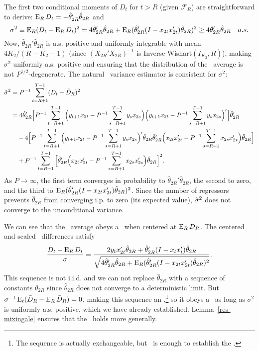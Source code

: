 \documentclass[11pt]{article}
\begin{document}
The first two conditional moments of $D_t$ for $t > R$ (given
$\mathcal{F}_R$) are straightforward to derive: $\operatorname{E}_R D_t = -
\hat{\theta}_{2R}' \hat{\theta}_{2R}$ and
\begin{equation*}
  \sigma^2 \equiv \operatorname{E}_R(D_t - \operatorname{E}_R D_t)^2 = 4
  \hat{\theta}_{2R}' \hat{\theta}_{2R} +
  \operatorname{E}_R(\hat{\theta}_{2R}' (I - x_{2t} x_{2t}')
  \hat{\theta}_{2R})^2   \geq 4 \hat{\theta}_{2R}'
  \hat{\theta}_{2R} \quad a.s.
\end{equation*}
Now, $\hat{\theta}_{2R}' \hat{\theta}_{2R}$ is
a.s. positive and uniformly integrable with mean $4 K_2 / (R - K_2 -
1)$ (since $(X_{2R}'X_{2R})^{-1}$ is Inverse-Wishart$(I_{K_2}, R)$),
making $\sigma^2$ uniformly a.s. positive and ensuring that the
distribution of the \oos\ average is not $P^{1/2}$-degenerate.  The
natural \oos\ variance estimator is consistent for $\sigma^2$:
\begin{align*}
  \hat{\sigma}^2 &= P^{-1} \sum_{t=R+1}^{T-1} (D_t - \bar{D}_{R})^2 \\
  &= 4 \hat{\theta}_{2R}' \Big[P^{-1} \sum_{t=R+1}^{T-1}
  \Big(y_{t+1} x_{2t} - P^{-1} \sum_{s=R+1}^{T-1} y_s x_{2s}\Big)
  \Big(y_{t+1} x_{2t} - P^{-1} \sum_{s=R+1}^{T-1} y_s
  x_{2s}\Big)'\Big] \hat{\theta}_{2R}' \\ & \quad - 4
  \Big[P^{-1} \sum_{t=R+1}^{T-1} \Big(y_{t+1} x_{2t} - P^{-1}
  \sum_{s=R+1}^{T-1} y_s x_{2s}\Big)' \hat{\theta}_{2R}
  \hat{\theta}_{2R}' \Big(x_{2t} x_{2t}' - P^{-1}
  \sum_{s=R+1}^{T-1} x_{2s} x_{2s}' \Big) \hat{\theta}_{2R} \Big]
  \\ &\quad + P^{-1} \sum_{t=R+1}^{T-1}
  \Big[\hat{\theta}_{2R}' \Big(x_{2t} x_{2t}' - P^{-1}
  \sum_{s=R+1}^{T-1} x_{2s} x_{2s}' \Big) \hat{\theta}_{2R}  \Big]^{2}.
\end{align*}
As $P \to \infty$, the first term converges in probability to
$\hat{\theta}_{2R}' \hat{\theta}_{2R}$, the second to zero,
and the third to $\operatorname{E}_R(\hat{\theta}_{2R}'(I - x_{2t}x_{2t}')
\hat{\theta}_{2R})^2$.  Since the number of regressors prevents
$\hat{\theta}_{2R}$ from converging i.p. to zero (its expected
value), $\hat{\sigma}^2$ does not converge to the unconditional
variance.

We can see that the \oos\ average obeys a \clt\ when centered at $\operatorname{E}_R
\bar{D}_R$.  The centered and scaled \oos\ differences satisfy
\begin{equation*}
  \frac{D_t - \operatorname{E}_R D_t}{\sigma} =
  \frac{2 y_{t} x_{2t}' \hat{\theta}_{2R} +
    \hat{\theta}_{2R}' (I - x_t x_t') \hat{\theta}_{2R}}{\sqrt{4
    \hat{\theta}_{2R}' \hat{\theta}_{2R} +
    \operatorname{E}_R(\hat{\theta}_{2R}'(I - x_{2t} x_{2t}') \hat{\theta}_{2R})^2}}.
\end{equation*}
This sequence is not i.i.d. and we can not replace $\hat{\theta}_{2R}$
with a sequence of constants $\theta_{2R}$ since $\hat{\theta}_{2R}$
does not converge to a deterministic limit.  But $\sigma^{-1}
\operatorname{E}_t(\bar{D}_{R} - \operatorname{E}_R\bar{D}_{R}) = 0$, making this sequence an
\mds,\footnote{The sequence is actually exchangeable, but \mds\ is
  enough to establish the \clt.} so it obeys a \clt\ as long as
$\sigma^2$ is uniformly a.s. positive, which we have already
established.  Lemma~\ref{res-mixingale} ensures that the \clt\ holds
more generally.
\end{document}
